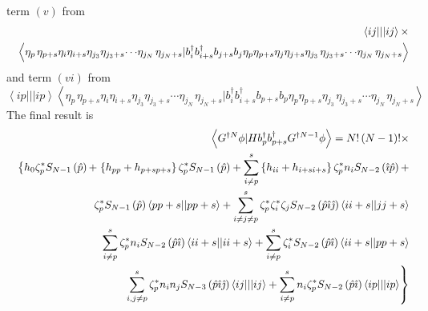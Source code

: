 \documentclass{article}
\begin{document}
term $\left( v\right) $ from%
\begin{eqnarray}
&&\left\langle ij|||ij\right\rangle \times  \notag \\
&&\left\langle \eta _{p\,}\eta _{p+s}\eta _{i}\eta _{i+s}\eta _{j_{3}}\eta
_{j_{3}+s}{\small \cdots }\eta _{j_{N}\,}\eta _{j_{N}+s}|b_{i}^{\dagger
}b_{i+s}^{\dagger }b_{j+s}b_{j}\eta _{p}\eta _{p+s}\eta _{j}\eta _{j+s}\eta
_{j_{3}\,}\eta _{j_{3}+s}{\small \cdots }\eta _{j_{N}\,}\eta
_{j_{N}+s}\right\rangle  \label{t5}
\end{eqnarray}%
and term $\left( vi\right) $ from%
\begin{equation}
\left\langle ip|||ip\right\rangle \left\langle \eta _{p\,}\eta _{p+s}\eta
_{i}\eta _{i+s}\eta _{j_{3}}\eta _{j_{3}+s}\cdots \eta _{j_{N}\,}\eta
_{j_{N}+s}|b_{i}^{\dagger }b_{i+s}^{\dagger }b_{p+s}b_{p}\eta _{p}\eta
_{p+s}\eta _{j_{3}\,}\eta _{j_{3}+s}\cdots \eta _{j_{N}\,}\eta
_{j_{N}+s}\right\rangle  \label{t6}
\end{equation}%
The final result is%
\begin{eqnarray}
&&\left\langle G^{\dagger N}\phi |Hb_{p}^{\dagger }b_{p+s}^{\dagger
}G^{\dagger N-1}\phi \right\rangle =N!\left( N-1\right) !\times  \notag \\
&&\left\{ h_{0}\zeta _{p}^{\ast }S_{N-1}\left( \hat{p}\right) +\right.
\left\{ h_{pp}+h_{p+sp+s}\right\} \zeta _{p}^{\ast }S_{N-1}\left( \hat{p}%
\right) +\sum_{i\neq p}^{s}\left\{ h_{ii}+h_{i+si+s}\right\} \zeta
_{p}^{\ast }n_{i}S_{N-2}\left( \hat{\imath}\hat{p}\right) +  \notag \\
&&\quad \quad \zeta _{p}^{\ast }S_{N-1}\left( \hat{p}\right) \left\langle
pp+s||pp+s\right\rangle +\sum_{i\neq j\neq p}^{s}\zeta _{p}^{\ast }\zeta
_{i}^{\ast }\zeta _{j}S_{N-2}\left( \hat{p}\hat{\imath}\hat{\jmath}\right)
\left\langle ii+s||jj+s\right\rangle  \notag \\
&&\left. {}\right. \qquad \qquad \qquad \sum_{i\neq p}^{s}\zeta _{p}^{\ast
}n_{i}S_{N-2}\left( \hat{p}\hat{\imath}\right) \left\langle
ii+s||ii+s\right\rangle +\sum_{i\neq p}^{s}\zeta _{i}^{\ast }S_{N-2}\left( 
\hat{p}\hat{\imath}\right) \left\langle ii+s||pp+s\right\rangle  \notag \\
&&\qquad \qquad \qquad \qquad \qquad \left. \sum_{i,j\neq p}^{s}\zeta
_{p}^{\ast }n_{i}n_{j}S_{N-3}\left( \hat{p}\hat{\imath}\hat{\jmath}\right)
\left\langle ij|||ij\right\rangle +\sum_{i\neq p}^{s}n_{i}\zeta _{p}^{\ast
}S_{N-2}\left( \hat{p}\hat{\imath}\right) \left\langle ip|||ip\right\rangle
\right\}  \label{Der}
\end{eqnarray}%
\end{document}
